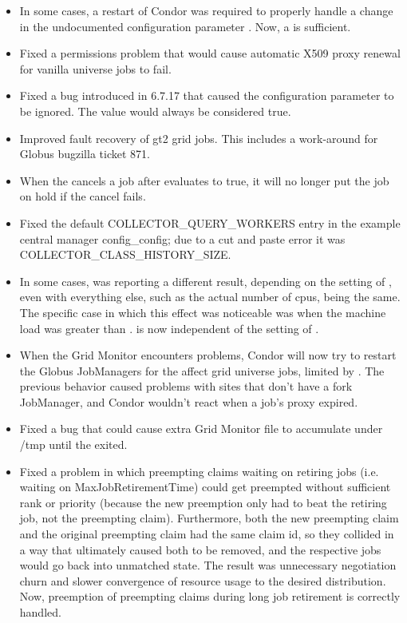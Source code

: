 \begin{itemize}
\item In some cases, a restart of Condor was required to properly handle
a change in the undocumented configuration parameter
. Now, a  is sufficient.

\item Fixed a permissions problem that would cause automatic X509 proxy renewal for vanilla universe jobs to fail.

\item Fixed a bug introduced in 6.7.17 that caused the configuration parameter
 to be ignored. The value would always be
considered true.

\item Improved fault recovery of gt2 grid jobs. This includes a work-around
for Globus bugzilla ticket 871.

\item When the  cancels a job after
 evaluates to true, it will no longer put the job
on hold if the cancel fails.

\item Fixed the default COLLECTOR\_QUERY\_WORKERS entry in the example
central manager config\_config; due to a cut and paste error it was
COLLECTOR\_CLASS\_HISTORY\_SIZE.

\item In some cases,  was reporting a different
result, depending on the setting of , even with
everything else, such as the actual number of cpus, being the same.
The specific case in which this effect was noticeable was when the
machine load was greater than .  
is now independent of the setting of .

\item When the Grid Monitor encounters problems, Condor will now try to
restart the Globus JobManagers for the affect grid universe jobs,
limited by . The
previous behavior caused problems with sites that don't have a fork
JobManager, and Condor wouldn't react when a job's proxy expired.

\item Fixed a bug that could cause extra Grid Monitor file to accumulate
under /tmp until the  exited.

\item Fixed a problem in which preempting claims waiting on retiring
jobs (i.e. waiting on MaxJobRetirementTime) could get preempted
without sufficient rank or priority (because the new preemption only
had to beat the retiring job, not the preempting claim).  Furthermore,
both the new preempting claim and the original preempting claim had
the same claim id, so they collided in a way that ultimately caused
both to be removed, and the respective jobs would go back into
unmatched state.  The result was unnecessary negotiation churn and
slower convergence of resource usage to the desired distribution.
Now, preemption of preempting claims during long job retirement is
correctly handled.


\end{itemize}
